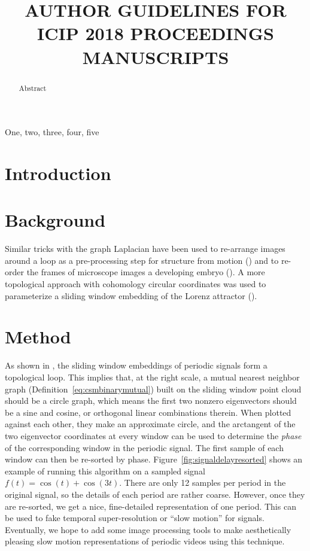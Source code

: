 \documentclass{article}
\title{AUTHOR GUIDELINES FOR ICIP 2018 PROCEEDINGS MANUSCRIPTS}
\begin{document}
%
\maketitle
%
\begin{abstract}
Abstract
\end{abstract}
%
\begin{keywords}
One, two, three, four, five
\end{keywords}
%


\section{Introduction}

\section{Background}

Similar tricks with the graph Laplacian have been used to re-arrange images around a loop as a pre-processing step for structure from motion (\cite{averbuch2015ringit}) and to re-order the frames of microscope images a developing embryo (\cite{dsilva2015diffusionvecordering}).  A more topological approach with cohomology circular coordinates was used to parameterize a sliding window embedding of the Lorenz attractor (\cite{de2012topological}).



\section{Method}
As shown in , the sliding window embeddings of periodic signals form a topological loop.  This implies that, at the right scale, a mutual nearest neighbor graph (Definition~\ref{eq:csmbinarymutual}) built on the sliding window point cloud should be a circle graph, which means the first two nonzero eigenvectors should be a sine and cosine, or orthogonal linear combinations therein.  When plotted against each other, they make an approximate circle, and the arctangent of the two eigenvector coordinates at every window can be used to determine the {\em phase} of the corresponding window in the periodic signal.  The first sample of each window can then be re-sorted by phase.  Figure~\ref{fig:signaldelayresorted} shows an example of running this algorithm on a sampled signal $f(t) = \cos(t) + \cos(3t)$.  There are only 12 samples per period in the original signal, so the details of each period are rather coarse.  However, once they are re-sorted, we get a nice, fine-detailed representation of one period.  This can be used to fake temporal super-resolution or ``slow motion'' for signals.  Eventually, we hope to add some image processing tools to make aesthetically pleasing slow motion representations of periodic videos using this technique.
\end{document}
